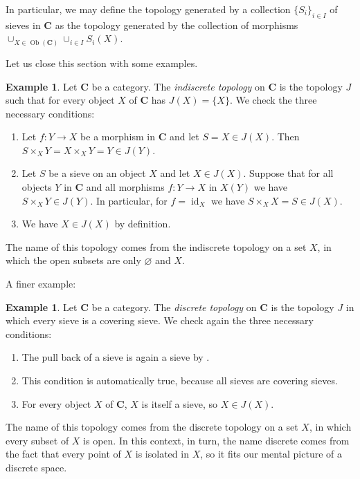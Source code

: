 \documentclass[12pt,reqno,a4paper]{amsart}
\theoremstyle{plain}
\theoremstyle{definition}
\newtheorem{exmp}[thm]{Example}
\theoremstyle{remark}
\begin{document}
In particular, we may define the topology generated by a collection $\{ S_{i} \}_{i \in I}$ of sieves in $\mathbf{C}$ as the topology generated by the collection of morphisms $\cup_{X \in \operatorname{Ob}(\mathbf{C})} \cup_{i \in I} S_{i}(X)$.

Let us close this section with some examples.

\begin{exmp}\label{exmp:indiscrete}
  Let $\mathbf{C}$ be a category.
  The \textit{indiscrete topology} on $\mathbf{C}$ is the topology $J$ such that for every object $X$ of $\mathbf{C}$ has $J(X) = \{ X \}$.
  We check the three necessary conditions:
  \begin{enumerate}[label=(T\arabic*)]
    \item Let $f \colon Y \to X$ be a morphism in $\mathbf{C}$ and let $S = X \in J(X)$.
      Then $S \times_{X} Y = X \times_{X} Y = Y \in J(Y)$.
    \item Let $S$ be a sieve on an object $X$ and let $X \in J(X)$.
      Suppose that for all objects $Y$ in $\mathbf{C}$ and all morphisms $f \colon Y \to X$ in $X(Y)$ we have $S \times_{X} Y \in J(Y)$.
      In particular, for $f = \operatorname{id}_{X}$ we have $S \times_{X} X = S \in J(X)$.
    \item We have $X \in J(X)$ by definition.
  \end{enumerate}

  The name of this topology comes from the indiscrete topology on a set $X$, in which the open subsets are only $\varnothing$ and $X$.
\end{exmp}

A finer example:

\begin{exmp}\label{exmp:discretetopology}
  Let $\mathbf{C}$ be a category.
  The \textit{discrete topology} on $\mathbf{C}$ is the topology $J$ in which every sieve is a covering sieve.
  We check again the three necessary conditions:
  \begin{enumerate}[label=(T\arabic*)]
    \item The pull back of a sieve is again a sieve by .
    \item This condition is automatically true, because all sieves are covering sieves.
    \item For every object $X$ of $\mathbf{C}$, $X$ is itself a sieve, so $X \in J(X)$.
  \end{enumerate}

  The name of this topology comes from the discrete topology on a set $X$, in which every subset of $X$ is open.
  In this context, in turn, the name discrete comes from the fact that every point of $X$ is isolated in $X$, so it fits our mental picture of a discrete space.
\end{exmp}
\end{document}

